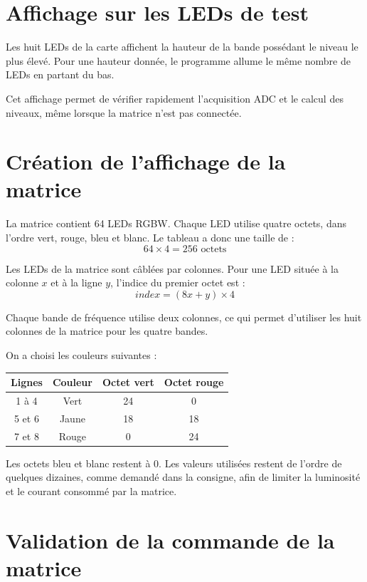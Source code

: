 \documentclass{report}
\begin{document}
\section{Affichage sur les LEDs de test}

Les huit LEDs de la carte affichent la hauteur de la bande possédant le niveau
le plus élevé. Pour une hauteur donnée, le programme allume le même nombre
de LEDs en partant du bas.

Cet affichage permet de vérifier rapidement l'acquisition ADC et le calcul
des niveaux, même lorsque la matrice n'est pas connectée.

\section{Création de l'affichage de la matrice}

La matrice contient 64 LEDs RGBW. Chaque LED utilise quatre octets, dans l'ordre vert, rouge, bleu et blanc. Le tableau a donc une taille de :
\[
64 \times 4 = 256 \text{ octets}
\]

Les LEDs de la matrice sont câblées par colonnes. Pour une LED située à la colonne \(x\) et à la ligne \(y\), l'indice du premier octet est :
\[
index = (8x+y)\times 4
\]

Chaque bande de fréquence utilise deux colonnes, ce qui permet d'utiliser les huit colonnes de la matrice pour les quatre bandes.

On a choisi les couleurs suivantes :

\begin{center}
\begin{tabular}{|c|c|c|c|}
\hline
\textbf{Lignes} & \textbf{Couleur} & \textbf{Octet vert} & \textbf{Octet rouge} \\
\hline
1 à 4 & Vert & 24 & 0 \\
\hline
5 et 6 & Jaune & 18 & 18 \\
\hline
7 et 8 & Rouge & 0 & 24 \\
\hline
\end{tabular}
\end{center}

Les octets bleu et blanc restent à 0. Les valeurs utilisées restent de l'ordre de quelques dizaines, comme demandé dans la consigne, afin de limiter la luminosité et le courant consommé par la matrice.

\section{Validation de la commande de la matrice}
\end{document}
